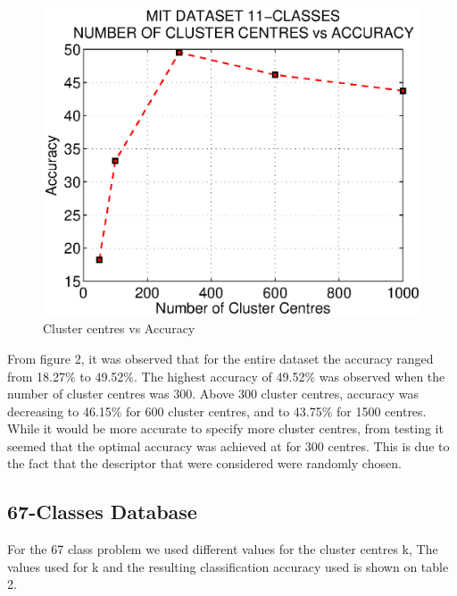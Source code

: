 \documentclass[10pt,twocolumn,letterpaper]{article}
\begin{document}
\begin{figure}[h]
      \centering
      \includegraphics[width=0.7\linewidth]{img/11c.eps}
      \caption{Cluster centres vs Accuracy}
\end{figure}

From figure 2, it was observed that for the entire dataset the accuracy ranged from 18.27\% to 49.52\%. The highest accuracy of 49.52\% was observed when the number of cluster centres was 300. Above 300 cluster centres, accuracy was decreasing to 46.15\% for 600 cluster centres, and to 43.75\% for 1500 centres. While it would be more accurate to specify more cluster centres, from  testing it seemed that the optimal accuracy was achieved at for 300 centres. This is due to the fact that the descriptor that were considered were randomly chosen. 

\subsection{67-Classes Database}
For the 67 class problem we used different values for the cluster centres k, The values used for k and the resulting classification accuracy used is shown on table 2.
\end{document}
